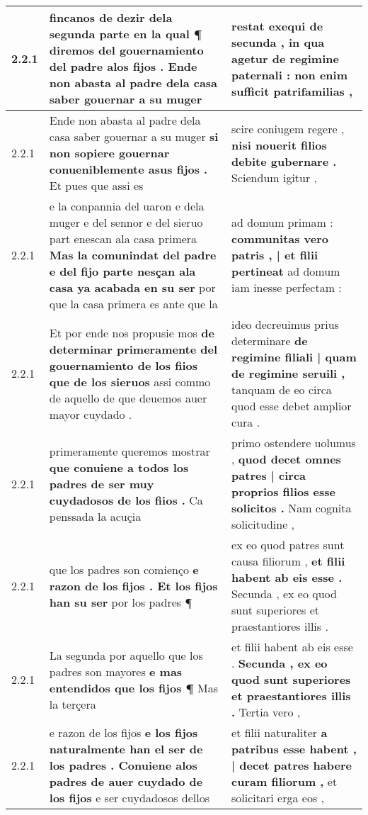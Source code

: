 \begin{tabular}{|p{1cm}|p{6.5cm}|p{6.5cm}|}
2.2.1 & fincanos de dezir dela segunda parte \textbf{ en la qual ¶ diremos del gouernamiento del padre alos fijos . } Ende non abasta al padre dela casa saber gouernar a su muger & restat exequi de secunda , \textbf{ in qua agetur de regimine paternali : } non enim sufficit patrifamilias , \\\hline
2.2.1 & Ende non abasta al padre dela casa saber gouernar a su muger \textbf{ si non sopiere gouernar conueniblemente asus fijos . } Et pues que assi es & scire coniugem regere , \textbf{ nisi nouerit filios debite gubernare . } Sciendum igitur , \\\hline
2.2.1 & e la conpannia del uaron e dela muger e del sennor e del sieruo part enescan ala casa primera \textbf{ Mas la comunindat del padre e del fijo parte nesçan ala casa ya acabada en su ser } por que la casa primera es ante que la & ad domum primam : \textbf{ communitas vero patris , | et filii pertineat } ad domum iam inesse perfectam : \\\hline
2.2.1 & Et por ende nos propusie mos \textbf{ de determinar primeramente del gouernamiento de los fiios que de los sieruos } assi commo de aquello de que deuemos auer mayor cuydado . & ideo decreuimus prius determinare \textbf{ de regimine filiali | quam de regimine seruili , } tanquam de eo circa quod esse debet amplior cura . \\\hline
2.2.1 & primeramente queremos mostrar \textbf{ que conuiene a todos los padres de ser muy cuydadosos de los fiios . } Ca penssada la acuçia & primo ostendere uolumus , \textbf{ quod decet omnes patres | circa proprios filios esse solicitos . } Nam cognita solicitudine , \\\hline
2.2.1 & que los padres son comienço \textbf{ e razon de los fijos . Et los fijos han su ser } por los padres ¶ & ex eo quod patres sunt causa filiorum , \textbf{ et filii habent ab eis esse . } Secunda , ex eo quod sunt superiores et praestantiores illis . \\\hline
2.2.1 & La segunda por aquello que los padres son mayores \textbf{ e mas entendidos que los fijos ¶ } Mas la terçera & et filii habent ab eis esse . \textbf{ Secunda , ex eo quod sunt superiores et praestantiores illis . } Tertia vero , \\\hline
2.2.1 & e razon de los fijos \textbf{ e los fijos naturalmente han el ser de los padres . Conuiene alos padres de auer cuydado de los fijos } e ser cuydadosos dellos & et filii naturaliter \textbf{ a patribus esse habent , | decet patres habere curam filiorum , } et solicitari erga eos , \\\hline

\end{tabular}
